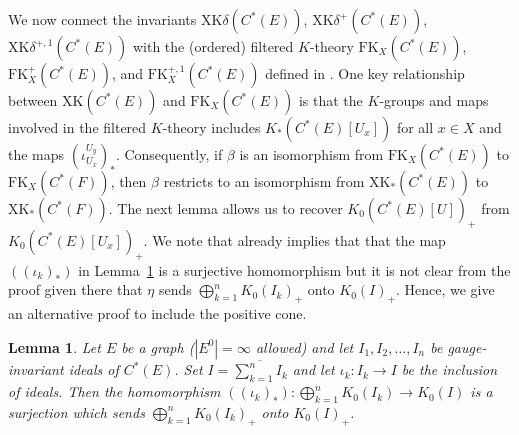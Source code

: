 \documentclass[12pt]{amsbook}%
\newcommand{\abknotation}[1]{\left(#1\right)}
\newtheorem{lemma}[theor]{Lemma}
\theoremstyle{defin}
\theoremstyle{remark}
\numberwithin{equation}{chapter}
\numberwithin{theor}{section}
\begin{document}
We now connect the invariants $\mathrm{XK}\delta( C^*(E))$, $\mathrm{XK}\delta^+( C^*(E))$, $\mathrm{XK}\delta^{+,1}( C^*(E))$ with the (ordered) filtered $K$-theory $\mathrm{FK}_X(C^*(E))$, $\mathrm{FK}_X^+(C^*(E))$, and $\mathrm{FK}_X^{+,1} (C^*(E))$ defined in \cite[Section~3.3]{segrerapws:gcgcfg}.  One key relationship between $\mathrm{XK}(C^*(E))$ and $\mathrm{FK}_X (C^*(E))$ is that the $K$-groups and maps involved in the filtered $K$-theory includes $K_*( C^*(E)[U_x])$ for all $x \in X$ and the maps $(\iota_{U_x}^{U_y})_*$.  Consequently, if $\beta$ is an isomorphism from $\mathrm{FK}_X(C^*(E))$ to $\mathrm{FK}_X(C^*(F))$, then $\beta$ restricts to an isomorphism from $\mathrm{XK}_*(C^*(E))$ to $\mathrm{XK}_*(C^*(F))$.  The next lemma allows us to recover $K_0(C^*(E)[U])_+$ from $K_0(C^*(E)[U_x])_+$.  We note that \cite[Lemma~8.3]{searbtk:rfkccka} already implies that that the map $\abknotation{(\iota_k)_*}$  in Lemma~\ref{lem-order-lifting} is a surjective homomorphism but it is not clear from the proof given there that $\eta$ sends $\bigoplus_{ k = 1}^n K_0(I_k)_+$ onto $K_0(I)_+$.   Hence, we give an alternative proof to include the positive cone.


\begin{lemma}\label{lem-order-lifting}
Let $E$ be a graph ($|E^0|=\infty$ allowed) and let $I_1, I_2, \ldots, I_n$ be gauge-invariant ideals of $C^*(E)$.  Set $I = \overline{ \sum_{k=1}^n I_k}$ and let $\iota_k \colon I_k \to I$ be the inclusion of ideals.  Then the homomorphism $\abknotation{(\iota_k)_*}  \colon \bigoplus_{ k = 1}^n K_0(I_k) \to K_0( I)$ is a surjection which sends $\bigoplus_{ k = 1}^n K_0(I_k)_+$ onto $K_0( I)_+$.
\end{lemma}
\end{document}
